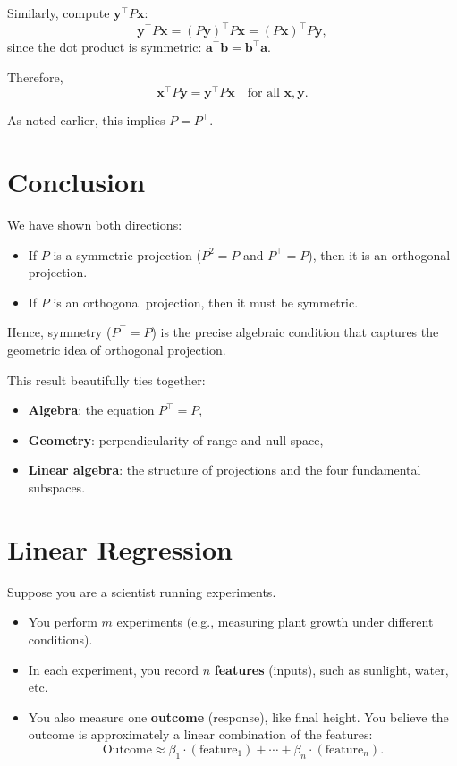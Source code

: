\documentclass{article}
\begin{document}
Similarly, compute \( \mathbf{y}^\top P \mathbf{x} \):
\[
\mathbf{y}^\top P \mathbf{x} = (P\mathbf{y})^\top P\mathbf{x} = (P\mathbf{x})^\top P\mathbf{y},
\]
since the dot product is symmetric: \( \mathbf{a}^\top \mathbf{b} = \mathbf{b}^\top \mathbf{a} \).

Therefore,
\[
\mathbf{x}^\top P \mathbf{y} = \mathbf{y}^\top P \mathbf{x} \quad \text{for all } \mathbf{x}, \mathbf{y}.
\]

As noted earlier, this implies \( P = P^\top \).

\section*{Conclusion}

We have shown both directions:
\begin{itemize}
\item If \( P \) is a symmetric projection (\( P^2 = P \) and \( P^\top = P \)), then it is an orthogonal projection.
    \item If \( P \) is an orthogonal projection, then it must be symmetric.
\end{itemize}

Hence, symmetry (\( P^\top = P \)) is the precise algebraic condition that captures the geometric idea of orthogonal projection.

This result beautifully ties together:
\begin{itemize}
\item \textbf{Algebra}: the equation \( P^\top = P \),
    \item \textbf{Geometry}: perpendicularity of range and null space,
    \item \textbf{Linear algebra}: the structure of projections and the four fundamental subspaces.
\end{itemize}










\section*{Linear Regression}

Suppose you are a scientist running experiments.

\begin{itemize}
\item You perform $m$ experiments (e.g., measuring plant growth under different conditions).
    \item In each experiment, you record $n$ \textbf{features} (inputs), such as sunlight, water, etc.
    \item You also measure one \textbf{outcome} (response), like final height.
You believe the outcome is approximately a linear combination of the features:
\[
\text{Outcome} \approx \beta_1 \cdot (\text{feature}_1) + \cdots + \beta_n \cdot (\text{feature}_n).
\]
\end{itemize}
\end{document}
